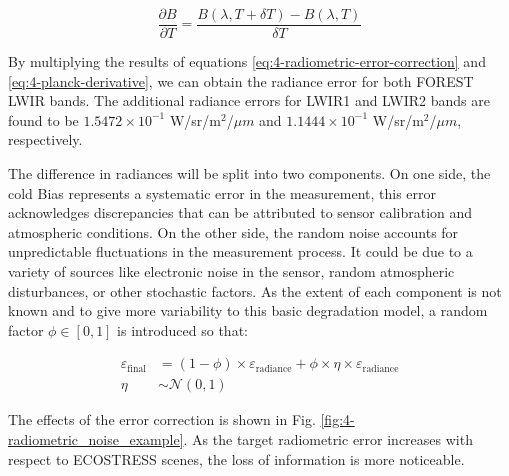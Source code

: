     \begin{equation}
        \frac{\partial B}{\partial T} = \frac{B(\lambda, T + \delta T) - B(\lambda, T)}{\delta T}
        \label{eq:4-planck-derivative}
    \end{equation}  
    
    By multiplying the results of equations \ref{eq:4-radiometric-error-correction} and \ref{eq:4-planck-derivative}, we can obtain the radiance error for both FOREST LWIR bands. The additional radiance errors for LWIR1 and LWIR2 bands are found to be \(1.5472 \times 10^{-1}\) W/sr/m\(^2\)/\(\mu m\) and \(1.1444 \times 10^{-1}\) W/sr/m\(^2\)/\(\mu m\), respectively.

    The difference in radiances will be split into two components. On one side, the cold Bias represents a systematic error in the measurement, this error acknowledges discrepancies that can be attributed to sensor calibration and atmospheric conditions. On the other side, the random noise accounts for unpredictable fluctuations in the measurement process. It could be due to a variety of sources like electronic noise in the sensor, random atmospheric disturbances, or other stochastic factors. As the extent of each component is not known and to give more variability to this basic degradation model, a random factor $\phi \in [0,1] $ is introduced so that:

    \begin{equation}
    \begin{aligned}
        \varepsilon_{\text{final}} &= (1 - \phi) \times \varepsilon_{\text{radiance}} + \phi \times \eta \times \varepsilon_{\text{radiance}} \\
        \eta & \sim \mathcal{N} (0,1)
    \end{aligned}
    \end{equation}    

    The effects of the error correction is shown in Fig. \ref{fig:4-radiometric_noise_example}. As the target radiometric error increases with respect to ECOSTRESS scenes, the loss of information is more noticeable.


